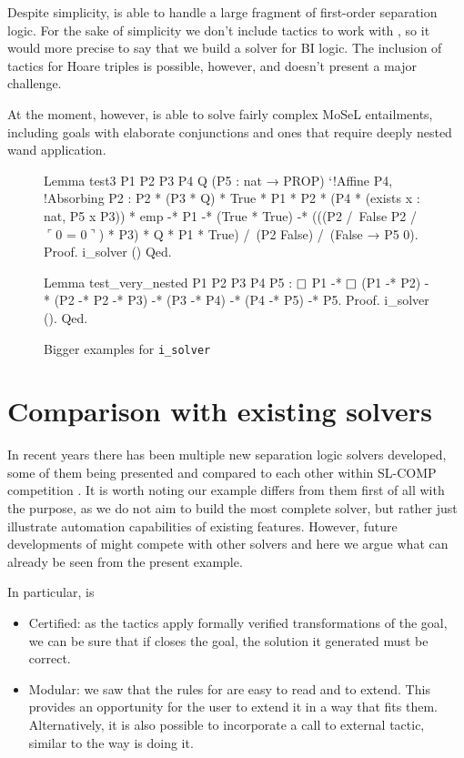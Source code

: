 Despite simplicity,  is able to handle a large fragment of first-order separation logic.
For the sake of simplicity we don't include tactics to work with , so it would more precise to say that we build a solver for BI logic.
The inclusion of tactics for Hoare triples is possible, however, and doesn't present a major challenge.

At the moment, however,  is able to solve fairly complex MoSeL entailments, including goals with elaborate conjunctions and ones that require deeply nested wand application.

\begin{figure}[H]
\begin{coq}
Lemma test3 P1 P2 P3 P4 Q (P5 : nat → PROP) `{!Affine P4, !Absorbing P2} :
  P2 * (P3 * Q) * True * P1 * P2 * (P4 * (exists x : nat, P5 x \/ P3)) * emp -*
    P1 -* (True * True) -*
  (((P2 /\ False \/ P2 /\ $\ulcorner$0 = 0$\urcorner$) * P3) * Q * P1 * True) /\
    (P2 \/ False) /\ (False → P5 0).
Proof. i_solver () Qed.
\end{coq}
\begin{coq}
Lemma test_very_nested P1 P2 P3 P4 P5 :
  $\mathop{\Box}$ P1 -* $\mathop{\Box}$ (P1 -* P2) -* (P2 -* P2 -* P3) -*
  (P3 -* P4) -* (P4 -* P5) -* P5.
Proof. i_solver (). Qed.
\end{coq}
\caption{Bigger examples for \texttt{i\_solver}}
\label{fig:bigger-example-i-solver}
\end{figure}

\section{Comparison with existing solvers}

In recent years there has been multiple new separation logic solvers developed, some of them being presented and compared to each other within SL-COMP competition \cite{sighireanuSLCOMPCompetitionSolvers2019}.
It is worth noting our example differs from them first of all with the purpose, as we do not aim to build the most complete solver, but rather just illustrate automation capabilities of existing features.
However, future developments of \coqe{i_solver} might compete with other solvers and here we argue what can already be seen from the present example.

In particular,  is
\begin{itemize}
\item Certified:
  as the tactics apply formally verified transformations of the goal, we can be sure that if  closes the goal, the solution it generated must be correct.
\item Modular:
  we saw that the rules for  are easy to read and to extend.
  This provides an opportunity for the user to extend it in a way that fits them.
  Alternatively, it is also possible to incorporate a call to external tactic, similar to the way  is doing it.
\end{itemize}

